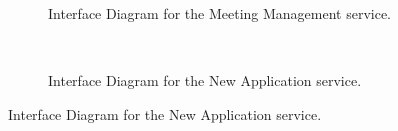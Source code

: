 \documentclass[12pt]{article}
\begin{document}
\begin{figure}[H]
\begin{subfigure}[H]{0.47\textwidth}
\centering	
{}
\caption{Interface Diagram for the Meeting Management service.}
\end{subfigure}
~
\begin{subfigure}[H]{0.47\textwidth}
\centering	
{}
\caption{Interface Diagram for the New Application service.}
\end{subfigure}


\end{figure}
\end{document}
